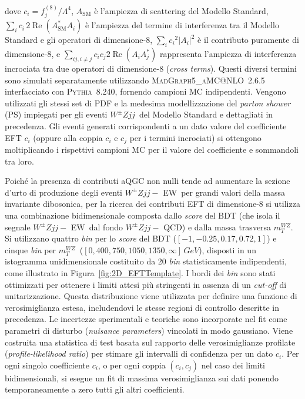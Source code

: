 \documentclass[11pt]{article}
\newcommand{\wzjjew}{$W^\pm Z jj-$ EW}
\newcommand{\wzjjqcd}{$W^\pm Z jj-$ QCD}
\newcommand{\wzjj}{$W^\pm Z jj$}
\newcommand{\mtwz}{\ensuremath{m_T^{WZ}}}
\begin{document}
dove $c_i = f_j^{(8)} / \Lambda^4$, $A_{\mathrm{SM}}$ è l'ampiezza di scattering del Modello Standard, $\sum_i c_i \, 2 \operatorname{Re}(A^*_{\mathrm{SM}} A_i)$ è l'ampiezza del termine di interferenza tra il Modello Standard e gli operatori di dimensione-8, $\sum_i {c_i}^2 |A_i|^2$ è il contributo puramente di dimensione-8, e $\sum_{ij,i\neq j} c_i c_j 2 \operatorname{Re}(A_i A^*_j)$ rappresenta l'ampiezza di interferenza incrociata tra due operatori di dimensione-8 (\textit{cross terms}).
Questi diversi termini sono simulati separatamente utilizzando \textsc{MadGraph5\_aMC@NLO}~2.6.5 interfacciato con \textsc{Pythia}~8.240, fornendo campioni MC indipendenti. Vengono utilizzati gli stessi set di PDF e la medesima modellizzazione del \textit{parton shower} (PS) impiegati per gli eventi \wzjj\ del Modello Standard e dettagliati in precedenza. Gli eventi generati corrispondenti a un dato valore del coefficiente EFT $c_i$ (oppure alla coppia $c_i$ e $c_j$ per i termini incrociati) si ottengono moltiplicando i rispettivi campioni MC per il valore del coefficiente e sommandoli tra loro.

Poiché la presenza di contributi aQGC non nulli tende ad aumentare la sezione d'urto di produzione degli eventi \wzjjew\ per grandi valori della massa invariante dibosonica, per la ricerca dei contributi EFT di dimensione-8 si utilizza una combinazione bidimensionale composta dallo \textit{score} del BDT (che isola il segnale \wzjjew\ dal fondo \wzjjqcd) e dalla massa trasversa \mtwz. Si utilizzano quattro \textit{bin} per lo \textit{score} del BDT ($[-1, -0.25, 0.17, 0.72, 1]$) e cinque \textit{bin} per \mtwz\ ($[0, 400, 750, 1050, 1350, \infty]\,\unit{GeV}$), disposti in un istogramma unidimensionale costituito da 20 \textit{bin} statisticamente indipendenti, come illustrato in Figura~\ref{fig:2D_EFTTemplate}. I bordi dei \textit{bin} sono stati ottimizzati per ottenere i limiti attesi più stringenti in assenza di un \textit{cut-off} di unitarizzazione.
Questa distribuzione viene utilizzata per definire una funzione di verosimiglianza estesa, includendovi le stesse regioni di controllo descritte in precedenza. Le incertezze sperimentali e teoriche sono incorporate nel fit come parametri di disturbo (\textit{nuisance parameters}) vincolati in modo gaussiano. 
Viene costruita una statistica di test basata sul rapporto delle verosimiglianze profilate (\textit{profile-likelihood ratio}) per stimare gli intervalli di confidenza per un dato $c_i$. Per ogni singolo coefficiente $c_i$, o per ogni coppia $(c_i, c_j)$ nel caso dei limiti bidimensionali, si esegue un fit di massima verosimiglianza sui dati ponendo temporaneamente a zero tutti gli altri coefficienti.
\end{document}

